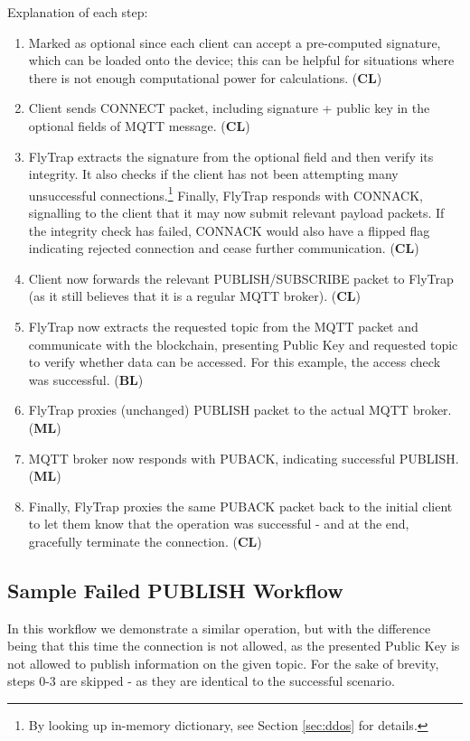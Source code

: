 Explanation of each step:
\begin{enumerate}\addtocounter{enumi}{-1}
    \item Marked as optional since each client can accept a pre-computed signature, which can be loaded onto the device; this can be helpful for situations where there is not enough computational power for calculations. (\textbf{CL})
    \item Client sends CONNECT packet, including signature + public key in the optional fields of MQTT message. (\textbf{CL})
    \item FlyTrap extracts the signature from the optional field and then verify its integrity. It also checks if the client has not been attempting many unsuccessful connections.\footnote{By looking up in-memory dictionary, see Section \ref{sec:ddos} for details.} Finally, FlyTrap responds with CONNACK, signalling to the client that it may now submit relevant payload packets. If the integrity check has failed, CONNACK would also have a flipped flag indicating rejected connection and cease further communication. (\textbf{CL})
    \item Client now forwards the relevant PUBLISH/SUBSCRIBE packet to FlyTrap (as it still believes that it is a regular MQTT broker). (\textbf{CL})
    \item FlyTrap now extracts the requested topic from the MQTT packet and communicate with the blockchain, presenting Public Key and requested topic to verify whether data can be accessed. For this example, the access check was successful. (\textbf{BL})
    \item FlyTrap proxies (unchanged) PUBLISH packet to the actual MQTT broker. (\textbf{ML})
    \item MQTT broker now responds with PUBACK, indicating successful PUBLISH. (\textbf{ML})
    \item Finally, FlyTrap proxies the same PUBACK packet back to the initial client to let them know that the operation was successful - and at the end, gracefully terminate the connection. (\textbf{CL})
\end{enumerate}

\subsection{Sample Failed PUBLISH Workflow}
In this workflow we demonstrate a similar operation, but with the difference being that this time the connection is not allowed, as the presented Public Key is not allowed to publish information on the given topic. For the sake of brevity, steps 0-3 are skipped - as they are identical to the successful scenario.

